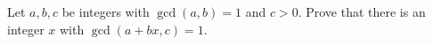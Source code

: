 Let $a,b,c$ be integers with $\gcd(a,b)=1$ and $c>0$. Prove that there is an integer $x$ with $\gcd(a+bx,c)=1$.
